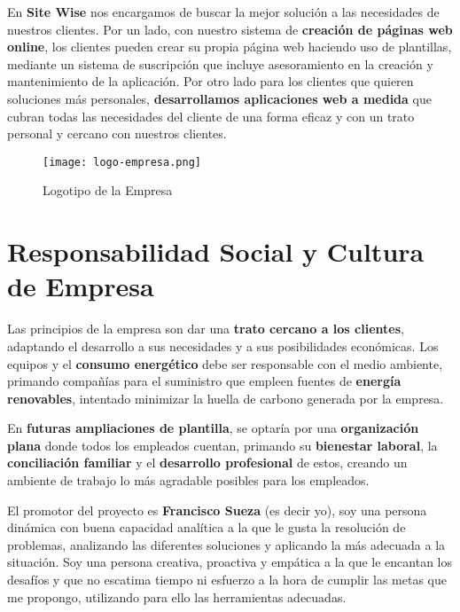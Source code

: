 En \textbf{Site Wise} nos encargamos de buscar la mejor solución a las necesidades de nuestros clientes. Por un lado, con nuestro sistema de \textbf{creación de páginas web online}, los clientes pueden crear su propia página web haciendo uso de plantillas, mediante un sistema de suscripción que incluye asesoramiento en la creación y mantenimiento de la aplicación. Por otro lado para los clientes que quieren soluciones más personales, \textbf{desarrollamos aplicaciones web a medida} que cubran todas las necesidades del cliente de una forma eficaz y con un trato personal y cercano con nuestros clientes.

\begin{figure}[H]
    \centering
    \texttt{[image: logo-empresa.png]}
    \caption{Logotipo de la Empresa}
\end{figure}

\section{Responsabilidad Social y Cultura de Empresa}
Las principios de la empresa son dar una \textbf{trato cercano a los clientes}, adaptando el desarrollo a sus necesidades y a sus posibilidades económicas. Los equipos y el \textbf{consumo energético} debe ser responsable con el medio ambiente, primando compañías para el suministro que empleen fuentes de \textbf{energía renovables}, intentado minimizar la huella de carbono generada por la empresa.

En \textbf{futuras ampliaciones de plantilla}, se optaría por una \textbf{organización plana} donde todos los empleados cuentan, primando su \textbf{bienestar laboral}, la \textbf{conciliación familiar} y el \textbf{desarrollo profesional} de estos, creando un ambiente de trabajo lo más agradable posibles para los empleados.

El promotor del proyecto es \textbf{Francisco Sueza} (es decir yo), soy una persona dinámica con buena capacidad analítica a la que le gusta la resolución de problemas, analizando las diferentes soluciones y aplicando la más adecuada a la situación. Soy una persona creativa, proactiva y empática a la que le encantan los desafíos y que no escatima tiempo ni esfuerzo a la hora de cumplir las metas que me propongo, utilizando para ello las herramientas adecuadas.

